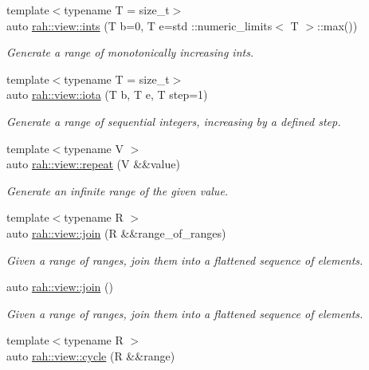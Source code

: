 \begin{DoxyCompactItemize}
{\footnotesize template$<$typename T  = size\+\_\+t$>$ }\\auto \mbox{\hyperlink{namespacerah_1_1view_a215e11ea5b9b06b56a794410e4285976}{rah\+::view\+::ints}} (T b=0, T e=std \+::numeric\+\_\+limits$<$ T $>$\+::max())
\begin{DoxyCompactList}\small\item\em Generate a range of monotonically increasing ints. \end{DoxyCompactList}\item 
{\footnotesize template$<$typename T  = size\+\_\+t$>$ }\\auto \mbox{\hyperlink{namespacerah_1_1view_ae66c3be408888c58118b1974cdece592}{rah\+::view\+::iota}} (T b, T e, T step=1)
\begin{DoxyCompactList}\small\item\em Generate a range of sequential integers, increasing by a defined step. \end{DoxyCompactList}\item 
{\footnotesize template$<$typename V $>$ }\\auto \mbox{\hyperlink{namespacerah_1_1view_abd22c411fe9e0bea622ba7f829743362}{rah\+::view\+::repeat}} (V \&\&value)
\begin{DoxyCompactList}\small\item\em Generate an infinite range of the given value. \end{DoxyCompactList}\item 
{\footnotesize template$<$typename R $>$ }\\auto \mbox{\hyperlink{namespacerah_1_1view_a4446e090b4ab3d5bb7418b7ee79532b8}{rah\+::view\+::join}} (R \&\&range\+\_\+of\+\_\+ranges)
\begin{DoxyCompactList}\small\item\em Given a range of ranges, join them into a flattened sequence of elements. \end{DoxyCompactList}\item 
auto \mbox{\hyperlink{namespacerah_1_1view_a1ae330f27898b3e012d519e7cd5814bb}{rah\+::view\+::join}} ()
\begin{DoxyCompactList}\small\item\em Given a range of ranges, join them into a flattened sequence of elements. \end{DoxyCompactList}\item 
{\footnotesize template$<$typename R $>$ }\\auto \mbox{\hyperlink{namespacerah_1_1view_a10a6eaf79243d6db807937d4f549419a}{rah\+::view\+::cycle}} (R \&\&range)

\end{DoxyCompactItemize}
